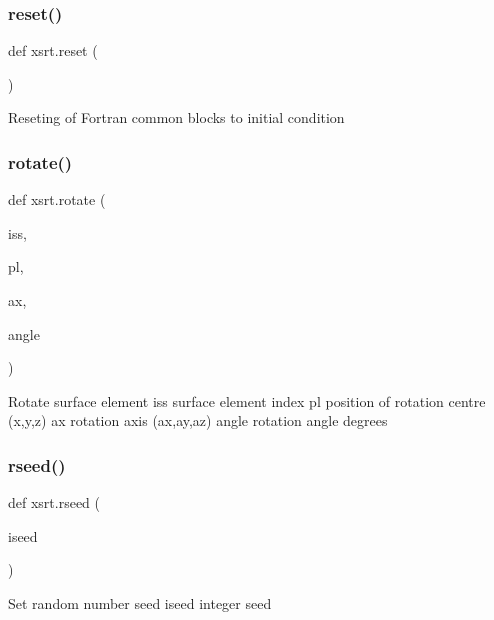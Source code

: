 \subsubsection{\texorpdfstring{reset()}{reset()}}
{\footnotesize\ttfamily def xsrt.\+reset (\begin{DoxyParamCaption}{ }\end{DoxyParamCaption})}

\begin{DoxyVerb}Reseting of Fortran common blocks to initial condition\end{DoxyVerb}
 \mbox{\label{namespacexsrt_a3fc1f652f58f672dcde6a8e3ec6665c7}} 
\subsubsection{\texorpdfstring{rotate()}{rotate()}}
{\footnotesize\ttfamily def xsrt.\+rotate (\begin{DoxyParamCaption}\item[{}]{iss,  }\item[{}]{pl,  }\item[{}]{ax,  }\item[{}]{angle }\end{DoxyParamCaption})}

\begin{DoxyVerb}Rotate surface element
    iss       surface element index
    pl        position of rotation centre (x,y,z)
    ax        rotation axis (ax,ay,az)
    angle     rotation angle degrees
\end{DoxyVerb}
 \mbox{\label{namespacexsrt_ac97fe76bbf9896cb58566d4c420800ac}} 
\subsubsection{\texorpdfstring{rseed()}{rseed()}}
{\footnotesize\ttfamily def xsrt.\+rseed (\begin{DoxyParamCaption}\item[{}]{iseed }\end{DoxyParamCaption})}

\begin{DoxyVerb}Set random number seed
    iseed      integer seed
\end{DoxyVerb}
 \mbox{\label{namespacexsrt_a140d1f2b7ed0aed3efefd16a28ff63e7}} 
